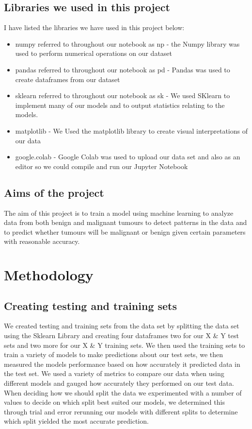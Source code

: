 \documentclass[conference]{IEEEtran}
\begin{document}
\subsection{Libraries we used in this project}
I have listed the libraries we have used in this project below:
\begin{itemize}
    \item numpy referred to throughout our notebook as np\cite{numpy}  - the Numpy library was used to perform numerical operations on our dataset
    \item pandas referred to throughout our notebook as pd \cite{pandas} - Pandas was used to create dataframes from our dataset
    \item sklearn referred to throughout our notebook as sk \cite{sklearn} - We used SKlearn to implement many of our models and to output statistics relating to the models.
    \item matplotlib \cite{matplotlib} - We Used the matplotlib library to create visual interpretations of our data
    \item google.colab \cite{googlecolab} - Google Colab was used to upload our data set and also as an editor so we could compile and run our Jupyter Notebook\cite{jupyter}
\end{itemize}
\subsection{Aims of the project}
 The aim of this project is to train a model using machine learning to analyze data from both benign and malignant tumours to detect patterns in the data and to predict whether tumours will be malignant or benign given certain parameters with reasonable accuracy.
\section{Methodology}
\subsection{Creating testing and training sets}
We created testing and training sets from the data set by splitting the data set using the Sklearn Library\cite{sklearn} and creating four dataframes two for our X \& Y test sets and two more for our X \& Y training sets.  We then used the training sets to train a variety of models to make predictions about our test sets, we then measured the models performance based on how accurately it predicted data in the test set.  We used a variety of metrics to compare our data when using different models and gauged how accurately they performed on our test data.  When deciding how we should split the data we experimented with a number of values to decide on which split best suited our models, we determined this through trial and error rerunning our models with different splits to determine which split yielded the most accurate prediction.  
\end{document}
